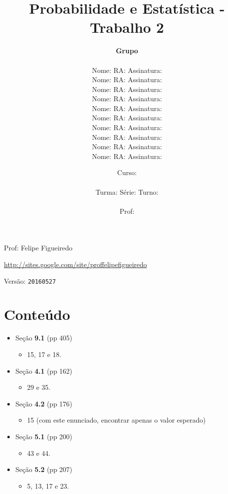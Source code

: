 \documentclass[a4paper]{article}
\date{
\bigskip
Curso: \underline{\hspace{8cm}}\\
\ \\
Turma: \underline{\hspace{1cm}} Série: \underline{\hspace{1cm}} Turno:
\underline{\hspace{1cm}}\\
\ \\
Prof: \underline{\hspace{8cm}}\\
}
\title{Probabilidade e Estatística - Trabalho 2}
\author{
{\bf Grupo}\\
\ \\
Nome: \underline{\hspace{6cm}} RA: \underline{\hspace{2cm}} Assinatura: \underline{\hspace{4cm}}\\
Nome: \underline{\hspace{6cm}} RA: \underline{\hspace{2cm}} Assinatura: \underline{\hspace{4cm}}\\
Nome: \underline{\hspace{6cm}} RA: \underline{\hspace{2cm}} Assinatura: \underline{\hspace{4cm}}\\
Nome: \underline{\hspace{6cm}} RA: \underline{\hspace{2cm}} Assinatura: \underline{\hspace{4cm}}\\
Nome: \underline{\hspace{6cm}} RA: \underline{\hspace{2cm}} Assinatura: \underline{\hspace{4cm}}\\
Nome: \underline{\hspace{6cm}} RA: \underline{\hspace{2cm}} Assinatura: \underline{\hspace{4cm}}\\
Nome: \underline{\hspace{6cm}} RA: \underline{\hspace{2cm}} Assinatura: \underline{\hspace{4cm}}\\
Nome: \underline{\hspace{6cm}} RA: \underline{\hspace{2cm}} Assinatura: \underline{\hspace{4cm}}\\
Nome: \underline{\hspace{6cm}} RA: \underline{\hspace{2cm}} Assinatura: \underline{\hspace{4cm}}\\
Nome: \underline{\hspace{6cm}} RA: \underline{\hspace{2cm}} Assinatura: \underline{\hspace{4cm}}\\
}
\begin{document}
\maketitle
\newpage

\parbox[c]{.825\textwidth}{\raggedright%
{Prof: Felipe Figueiredo\par}
{\url{http://sites.google.com/site/proffelipefigueiredo}\par}
}

Versão: \verb|20160527|




\section{Conteúdo}

\begin{itemize}
\item Seção {\bf 9.1} (pp 405)
  \begin{itemize}
  \item 15, 17 e 18.
  \end{itemize}
\item Seção {\bf 4.1} (pp 162)
  \begin{itemize}
  \item 29 e 35.
  \end{itemize}
\item Seção {\bf 4.2} (pp 176)
  \begin{itemize}
  \item 15 (com este enunciado, encontrar apenas o valor esperado)
  \end{itemize}
\item Seção {\bf 5.1} (pp 200)
  \begin{itemize}
  \item 43 e 44.
  \end{itemize}
\item Seção {\bf 5.2} (pp 207)
  \begin{itemize}
  \item 5, 13, 17 e 23.
  \end{itemize}
\end{itemize}
\end{document}
